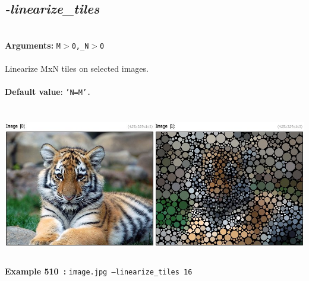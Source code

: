 \documentclass[a4paper,11pt,twoside]{book}
\begin{document}
\subsection{\emph{-linearize\_tiles} }\vspace*{-0.5em}
~\\\textbf{Arguments: } 
{\small \texttt{M$>$0,\_N$>$0}}\\~\\
Linearize MxN tiles on selected images.
~\\~\\\textbf{Default value}: {\small \texttt{'N=M'.}}
\begin{center}\includegraphics[keepaspectratio=true,height=7cm,width=\textwidth]{img/gmic_def510.jpg}\\
{\footnotesize \textbf{Example 510~:} \texttt{image.jpg --linearize\_tiles 16}}
\end{center}
\end{document}
